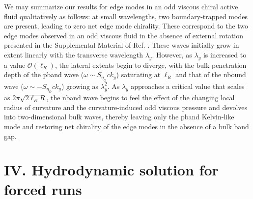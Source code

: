 \documentclass[%
 reprint,
superscriptaddress,
longbibliography,
 amsmath,amssymb,
 prl,
 citeautoscript,
]{revtex4-1}
\begin{document}
We may summarize our results for edge modes in an odd viscous chiral active fluid qualitatively as follows: at small wavelengths, two boundary-trapped modes are present, leading to zero net edge mode chirality. These correspond to the two edge modes observed in an odd viscous fluid in the absence of external rotation presented in the Supplemental Material of Ref. \cite{boundary_waves}. These waves initially grow in extent linearly with the transverse wavelength $\lambda_y$. However, as $\lambda_y$ is increased to a value $\mathcal{O} (\ell_R)$, the lateral extents begin to diverge, with the bulk penetration depth of the pband wave ($\omega \sim S_{\eta_O} c k_y$) saturating at $\ell_R$ and that of the nbound wave ($\omega \sim - S_{\eta_O} c k_y$) growing as $\lambda_y^2$. As $\lambda_y$ approaches a critical value that scales as $2 \pi \sqrt{2 \ell_R R}$, the nband wave begins to feel the effect of the changing local radius of curvature and the curvature-induced odd viscous pressure and devolves into two-dimensional bulk waves, thereby leaving only the pband Kelvin-like mode and restoring net chirality of the edge modes in the absence of a bulk band gap.

\section{IV. Hydrodynamic solution for forced runs}
\end{document}
